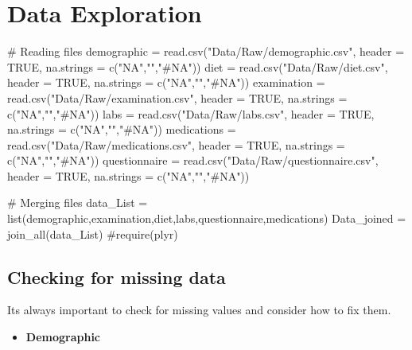 \hypertarget{data-exploration}{%
\section{Data Exploration}\label{data-exploration}}

\begin{Schunk}
\begin{Sinput}
# Reading files
demographic   = read.csv("Data/Raw/demographic.csv", header = TRUE, na.strings = c("NA","","#NA"))
diet          = read.csv("Data/Raw/diet.csv", header = TRUE, na.strings = c("NA","","#NA"))
examination   = read.csv("Data/Raw/examination.csv", header = TRUE, na.strings = c("NA","","#NA"))
labs          = read.csv("Data/Raw/labs.csv", header = TRUE, na.strings = c("NA","","#NA"))
medications   = read.csv("Data/Raw/medications.csv", header = TRUE, na.strings = c("NA","","#NA"))
questionnaire = read.csv("Data/Raw/questionnaire.csv", header = TRUE, na.strings = c("NA","","#NA"))

# Merging files
data_List = list(demographic,examination,diet,labs,questionnaire,medications)
Data_joined = join_all(data_List) #require(plyr)
\end{Sinput}
\end{Schunk}

\hypertarget{checking-for-missing-data}{%
\subsection{Checking for missing data}\label{checking-for-missing-data}}

Its always important to check for missing values and consider how to fix
them.

\begin{itemize}
\tightlist
\item
  \textbf{Demographic}
\end{itemize}

